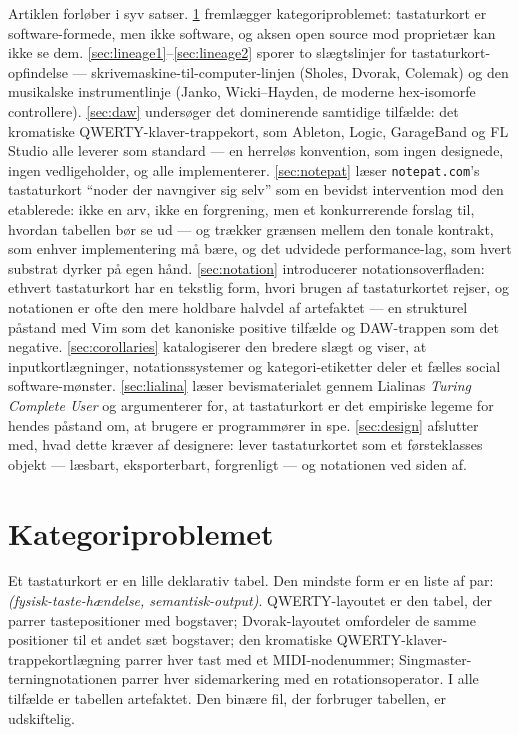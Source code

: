 \documentclass[10pt,letterpaper,twocolumn]{article}
\begin{document}
Artiklen forløber i syv satser. \textsection\ref{sec:category} fremlægger kategoriproblemet: tastaturkort er software-formede, men ikke software, og aksen open source mod proprietær kan ikke se dem. \textsection\ref{sec:lineage1}--\ref{sec:lineage2} sporer to slægtslinjer for tastaturkort-opfindelse --- skrivemaskine-til-computer-linjen (Sholes, Dvorak, Colemak) og den musikalske instrumentlinje (Janko, Wicki--Hayden, de moderne hex-isomorfe controllere). \textsection\ref{sec:daw} undersøger det dominerende samtidige tilfælde: det kromatiske QWERTY-klaver-trappekort, som Ableton, Logic, GarageBand og FL Studio alle leverer som standard --- en herreløs konvention, som ingen designede, ingen vedligeholder, og alle implementerer. \textsection\ref{sec:notepat} læser \texttt{notepat.com}'s tastaturkort ``noder der navngiver sig selv'' som en bevidst intervention mod den etablerede: ikke en arv, ikke en forgrening, men et konkurrerende forslag til, hvordan tabellen bør se ud --- og trækker grænsen mellem den tonale kontrakt, som enhver implementering må bære, og det udvidede performance-lag, som hvert substrat dyrker på egen hånd. \textsection\ref{sec:notation} introducerer notationsoverfladen: ethvert tastaturkort har en tekstlig form, hvori brugen af tastaturkortet rejser, og notationen er ofte den mere holdbare halvdel af artefaktet --- en strukturel påstand med Vim som det kanoniske positive tilfælde og DAW-trappen som det negative. \textsection\ref{sec:corollaries} katalogiserer den bredere slægt og viser, at inputkortlægninger, notationssystemer og kategori-etiketter deler et fælles social software-mønster. \textsection\ref{sec:lialina} læser bevismaterialet gennem Lialinas \emph{Turing Complete User} og argumenterer for, at tastaturkort er det empiriske legeme for hendes påstand om, at brugere er programmører in spe. \textsection\ref{sec:design} afslutter med, hvad dette kræver af designere: lever tastaturkortet som et førsteklasses objekt --- læsbart, eksporterbart, forgrenligt --- og notationen ved siden af.

\section{Kategoriproblemet}
\label{sec:category}

Et tastaturkort er en lille deklarativ tabel. Den mindste form er en liste af par: \emph{(fysisk-taste-hændelse, semantisk-output)}. QWERTY-layoutet er den tabel, der parrer tastepositioner med bogstaver; Dvorak-layoutet omfordeler de samme positioner til et andet sæt bogstaver; den kromatiske QWERTY-klaver-trappekortlægning parrer hver tast med et MIDI-nodenummer; Singmaster-terningnotationen parrer hver sidemarkering med en rotationsoperator. I alle tilfælde er tabellen artefaktet. Den binære fil, der forbruger tabellen, er udskiftelig.
\end{document}
